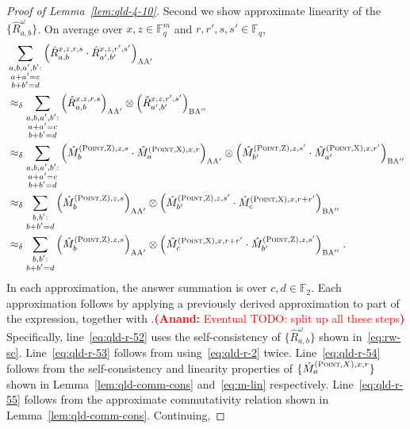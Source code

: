 \documentclass[11pt]{article}
\theoremstyle{definition}
\newcommand{\F}{\ensuremath{\mathbb{F}}}
\newcommand{\labelstyle}[1]{\ensuremath{\textsc{#1}}\xspace}
\newcommand{\xpt}{\labelstyle{X}}
\newcommand{\zpt}{\labelstyle{Z}}
\newcommand{\alice}{\labelstyle{A}}
\newcommand{\bob}{\labelstyle{B}}
\newcommand{\typestyle}[1]{\ensuremath{\textsc{#1}}\xspace}
\newcommand{\Point}{\typestyle{Point}}
\newcommand{\anote}[1]{\textcolor{red}{\small {\textbf{(Anand:} #1\textbf{) }}}}
\newcommand{\anote}[1]{}
\begin{document}
\begin{proof}[Proof of Lemma~\ref{lem:qld-4-10}]
	Second we show approximate linearity of the $\{ \hat{R}^\omega_{a,b} \}$. On average over $x,z \in \F_q^m$ and $r,r',s,s' \in \F_q$, 
	\begin{align}
	& \sum_{\substack{a,b,a',b' : \\ a + a' = c \\ b + b' = d}} \Big (\hat{R}^{x,z,r,s}_{a,b} \cdot \hat{R}^{x,z,r',s'}_{a',b'} \Big)_{\alice \alice'} \notag\\
	&\approx_\delta \sum_{\substack{a,b,a',b' : \\ a + a' = c \\ b + b' = d}} \Big( \hat{R}^{x,z,r,s}_{a,b} \Big)_{\alice \alice'} \otimes \Big( \hat{R}^{x,z,r',s'}_{a',b'} \Big)_{\bob \alice''} \label{eq:qld-r-52} \\
		&\approx_\delta \sum_{\substack{a,b,a',b': \\ a + a' = c \\ b + b' = d}} \Big( \hat{M}^{(\Point,\zpt),z,s}_{b} \cdot \hat{M}^{(\Point,\xpt),x,r}_{a}
 \Big)_{\alice \alice'} \otimes \Big(\hat{M}^{(\Point,\zpt),z,s'}_{b'} \cdot \hat{M}^{(\Point,\xpt),x,r'}_{a'} \Big)_{\bob \alice''} \label{eq:qld-r-53} \\
 	&\approx_\delta \sum_{\substack{b,b': \\ b + b' = d}} \Big( \hat{M}^{(\Point,\zpt),z,s}_{b}
 \Big)_{\alice \alice'} \otimes \Big(\hat{M}^{(\Point,\zpt),z,s'}_{b'} \cdot \hat{M}^{(\Point,\xpt),x,r+r'}_{c} \Big)_{\bob \alice''} \label{eq:qld-r-54} \\
 &\approx_\delta \sum_{\substack{b,b' : \\ b + b' = d}} \Big( \hat{M}^{(\Point,\zpt),z,s}_{b}
 \Big)_{\alice \alice'} \otimes \Big(\hat{M}^{(\Point,\xpt),x,r+r'}_{c} \cdot \hat{M}^{(\Point,\zpt),z,s'}_{b'}  \Big)_{\bob \alice''} \;.\label{eq:qld-r-55}
 \end{align}
	In each approximation, the answer summation is over $c,d \in \F_2$. Each approximation follows by applying a previously derived approximation to part of the expression, together with .\anote{Eventual TODO: split up all these steps} Specifically, line~\eqref{eq:qld-r-52} uses the self-consistency of $\{ \hat{R}^\omega_{a,b} \}$ shown in~\eqref{eq:rw-sc}. Line~\eqref{eq:qld-r-53} follows from using~\eqref{eq:qld-r-2} twice. Line~\eqref{eq:qld-r-54} follows from the self-consistency and linearity properties of $\{ \hat{M}^{(\Point,X),x,r}_a \}$ shown in Lemma~\ref{lem:qld-comm-cons} and~\eqref{eq:m-lin} respectively. Line~\eqref{eq:qld-r-55} follows from the approximate commutativity relation shown in Lemma~\ref{lem:qld-comm-cons}.  Continuing,

\end{proof}
\end{document}
